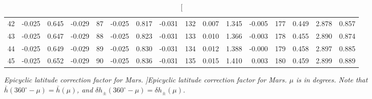 \begin{table}
{\begin{tabular}{rrrr|rrrr|rrrr|crrr}
 42 & \tiny{ -0.025} &   0.645 & \tiny{ -0.029} &  87 & \tiny{ -0.025} &   0.817 & \tiny{ -0.031} & 132 & \tiny{  0.007} &   1.345 & \tiny{ -0.005} & 177 & \tiny{  0.449} &   2.878 & \tiny{  0.857}\\
 43 & \tiny{ -0.025} &   0.647 & \tiny{ -0.029} &  88 & \tiny{ -0.025} &   0.823 & \tiny{ -0.031} & 133 & \tiny{  0.010} &   1.366 & \tiny{ -0.003} & 178 & \tiny{  0.455} &   2.890 & \tiny{  0.874}\\
 44 & \tiny{ -0.025} &   0.649 & \tiny{ -0.029} &  89 & \tiny{ -0.025} &   0.830 & \tiny{ -0.031} & 134 & \tiny{  0.012} &   1.388 & \tiny{ -0.000} & 179 & \tiny{  0.458} &   2.897 & \tiny{  0.885}\\
 45 & \tiny{ -0.025} &   0.652 & \tiny{ -0.029} &  90 & \tiny{ -0.025} &   0.836 & \tiny{ -0.031} & 135 & \tiny{  0.015} &   1.410 & \tiny{  0.003} & 180 & \tiny{  0.459} &   2.899 & \tiny{  0.889}\\
 \end{tabular}}
\caption[\em  Epicyclic latitude correction factor for Mars. ]{\em Epicyclic latitude correction factor for Mars. $\mu$ is in degrees. Note that $\bar{h}(360^\circ-\mu) = \bar{h}(\mu)$, and $\delta h_{\pm}(360^\circ-\mu) = \delta h_{\pm}(\mu)$. }\label{tlat2m}
\end{table}

